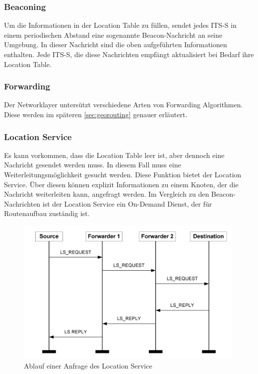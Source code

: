 \subsubsection{Beaconing}
Um die Informationen in der Location Table zu füllen, sendet jedes \ac{ITS-S} in einem periodischen Abstand eine sogenannte Beacon-Nachricht an seine Umgebung. In dieser Nachricht sind die oben aufgeführten Informationen enthalten. Jede \ac{ITS-S}, die diese Nachrichten empfängt aktualisiert bei Bedarf ihre Location Table.

\subsubsection{Forwarding}
Der Networklayer untersützt verschiedene Arten von Forwarding Algorithmen. Diese werden im späteren \autoref{sec:georouting} genauer erläutert.

\subsubsection{Location Service}
Es kann vorkommen, dass die Location Table leer ist, aber dennoch  eine Nachricht gesendet werden muss. In diesem Fall muss eine Weiterleitungsmöglichkeit gesucht werden. Diese Funktion bietet der Location Service. 
Über diesen können explizit Informationen zu einem Knoten, der die Nachricht weiterleiten kann, angefragt werden. Im Vergleich zu den Beacon-Nachrichten ist der Location Service ein On-Demand Dienst, der für Routenaufbau zuständig ist.

\begin{figure}
	\includegraphics[width=0.99\textwidth]{content/images/03_networklayer/location-service-diagramm.jpg}
	\caption{Ablauf einer Anfrage des Location Service}
	\label{fig:locser}
\end{figure}

